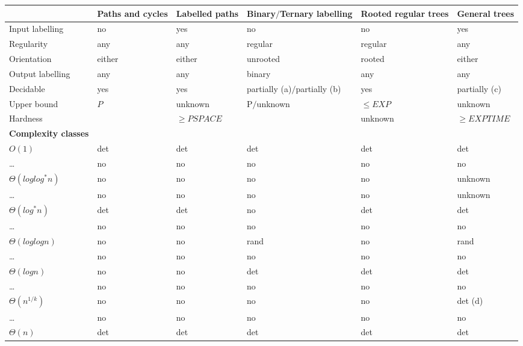 \begin{table}
  \begin{tabular}{|p{1.90cm}|p{1.90cm}|p{1.90cm}|p{1.90cm}|p{1.90cm}|p{1.90cm}|}
  \hline %
   & Paths and cycles & Labelled paths & Binary$\slash$Ternary labelling & Rooted regular trees & General trees \\
  \hline 
    Input labelling & no & yes & no & no & yes \\
  \hline

    Regularity & any & any & regular & regular & any \\
  \hline

    Orientation & either & either & unrooted & rooted & either \\
  \hline

    \raggedright Output labelling & any & any & binary & any & any \\
  \hline

    Decidable & yes & yes & partially (a)$\slash$partially (b) & yes & partially (c) \\
  \hline

    Upper bound & $P$ & unknown & P$\slash$unknown & $\leq EXP$ & unknown \\
  \hline

    Hardness &  & $\geq PSPACE$ &  & unknown & $\geq EXPTIME$ \\
  \hline

    \textbf{Complexity classes} &  &  &  &  &  \\
  \hline
    $O(1)$ & det & det & det & det & det \\
  \hline
    \dots & no & no & no & no & no \\
  \hline
    $\Theta(log log^* n)$ & no & no & no & no & unknown \\
  \hline
    \dots & no & no & no & no & unknown \\
  \hline
    $\Theta(log^* n)$ & det & det & no & det & det \\
  \hline
    \dots & no & no & no & no & no \\
  \hline
    $\Theta(log log n)$ & no & no & rand & no & rand \\
  \hline
    \dots & no & no & no & no & no \\
  \hline
    $\Theta(log n)$ & no & no & det & det & det \\
  \hline
    \dots & no & no & no & no & no \\
  \hline
    $\Theta(n^{1/k})$ & no & no & no & no & det (d) \\
  \hline
    \dots & no & no & no & no & no \\
  \hline
    $\Theta(n)$ & det & det & det & det & det \\
  \hline


\end{tabular}
\end{table}
